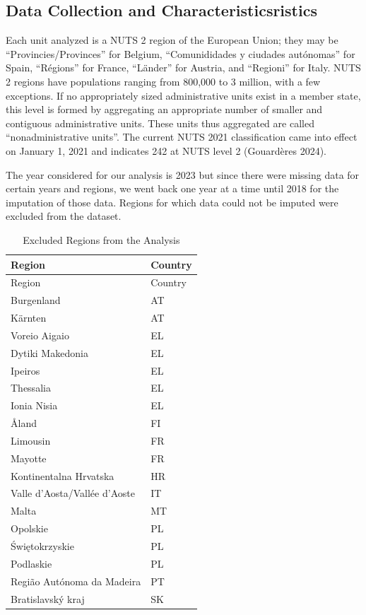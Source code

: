 \documentclass[
  letterpaper,
  DIV=11,
  numbers=noendperiod,
  abstract]{scrartcl}
\begin{document}
\subsection{Data Collection and
Characteristicsristics}\label{data-collection-and-characteristicsristics}

Each unit analyzed is a NUTS 2 region of the European Union; they may be
``Provincies/Provinces'' for Belgium, ``Comunididades y ciudades
autónomas'' for Spain, ``Régions'' for France, ``Länder'' for Austria,
and ``Regioni'' for Italy. NUTS 2 regions have populations ranging from
800,000 to 3 million, with a few exceptions. If no appropriately sized
administrative units exist in a member state, this level is formed by
aggregating an appropriate number of smaller and contiguous
administrative units. These units thus aggregated are called
``nonadministrative units''. The current NUTS 2021 classification came
into effect on January 1, 2021 and indicates 242 at NUTS level 2
(Gouardères 2024).

The year considered for our analysis is 2023 but since there were
missing data for certain years and regions, we went back one year at a
time until 2018 for the imputation of those data. Regions for which data
could not be imputed were excluded from the dataset.

\begin{longtable}[]{@{}ll@{}}
\caption{Excluded Regions from the Analysis}\tabularnewline
\toprule\noalign{}
Region & Country \\
\midrule\noalign{}
\endfirsthead
\toprule\noalign{}
Region & Country \\
\midrule\noalign{}
\endhead
\bottomrule\noalign{}
\endlastfoot
Burgenland & AT \\
Kärnten & AT \\
Voreio Aigaio & EL \\
Dytiki Makedonia & EL \\
Ipeiros & EL \\
Thessalia & EL \\
Ionia Nisia & EL \\
Åland & FI \\
Limousin & FR \\
Mayotte & FR \\
Kontinentalna Hrvatska & HR \\
Valle d'Aosta/Vallée d'Aoste & IT \\
Malta & MT \\
Opolskie & PL \\
Świętokrzyskie & PL \\
Podlaskie & PL \\
Região Autónoma da Madeira & PT \\
Bratislavský kraj & SK \\
\end{longtable}
\end{document}
